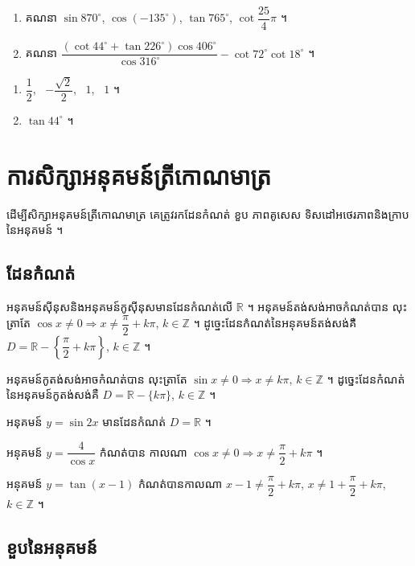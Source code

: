\begin{pro}
\begin{enumerate}[1]
  \item គណនា $\sin 870^\circ$, $\cos(-135^\circ)$, $\tan 765^\circ$, $\cot\dfrac{25}{4}\pi$ ។
  \item គណនា $\dfrac{(\cot 44^\circ + \tan 226^\circ)\cos 406^\circ}{\cos 316^\circ} - \cot 72^\circ\cot 18^\circ$ ។
\end{enumerate}
\ans
\begin{enumerate}[1]
  \item $\dfrac{1}{2}$, \ $-\dfrac{\sqrt{2}}{2}$, \ $1$, \ $1$ ។
  \item $\tan 44^\circ$ ។
\end{enumerate}
\end{pro}

\section{ការសិក្សាអនុគមន៍ត្រីកោណមាត្រ}

ដើម្បីសិក្សាអនុគមន៍ត្រីកោណមាត្រ គេត្រូវរកដែនកំណត់ ខួប ភាពគូសេស ទិសដៅអថេរភាពនិងក្រាបនៃអនុគមន៍ ។

\subsection{ដែនកំណត់}

អនុគមន៍ស៊ីនុសនិងអនុគមន៍កូស៊ីនុសមានដែនកំណត់លើ $\mathbb{R}$ ។ អនុគមន៍តង់សង់អាចកំណត់បាន លុះត្រាតែ $\cos x \ne 0 \Rightarrow x \ne \dfrac{\pi}{2} + k\pi$, $k \in \mathbb{Z}$ ។ ដូច្នេះដែនកំណត់នៃអនុគមន៍តង់សង់គឺ $D = \mathbb{R} - \left\{\dfrac{\pi}{2} + k\pi\right\}$, $k \in \mathbb{Z}$ ។

អនុគមន៍កូតង់សង់អាចកំណត់បាន លុះត្រាតែ $\sin x \ne 0 \Rightarrow x \ne k\pi$, $k \in \mathbb{Z}$ ។ ដូច្នេះដែនកំណត់នៃអនុគមន៍កូតង់សង់គឺ $D = \mathbb{R} - \{k\pi\}$, $k \in \mathbb{Z}$ ។

\begin{example}[ឧទាហរណ៍]
អនុគមន៍ $y = \sin 2x$ មានដែនកំណត់ $D = \mathbb{R}$ ។

អនុគមន៍ $y = \dfrac{4}{\cos x}$ កំណត់បាន កាលណា $\cos x \ne 0 \Rightarrow x \ne \dfrac{\pi}{2} + k\pi$ ។

អនុគមន៍ $y = \tan(x - 1)$ កំណត់បានកាលណា $x - 1 \ne \dfrac{\pi}{2} + k\pi$, $x \ne 1 + \dfrac{\pi}{2} + k\pi$, $k \in \mathbb{Z}$ ។
\end{example}

\subsection{ខួបនៃអនុគមន៍}


